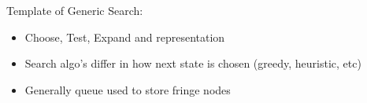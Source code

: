 \documentclass{article}
\begin{document}
    Template of Generic Search:
    \begin{itemize}
        \item Choose, Test, Expand and representation
        \item Search algo's differ in how next state is chosen (greedy, heuristic, etc)
        \item Generally queue used to store fringe nodes
    \end{itemize}

\printbibliography[title={Referências}]
\end{document}
